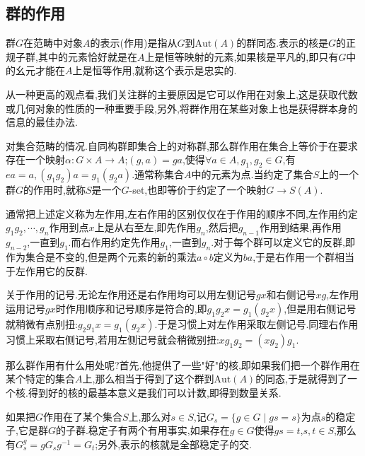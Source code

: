 \subsection{群的作用}

群$G$在范畴中对象$A$的表示(作用)是指从$G$到$\mathrm{Aut}(A)$的群同态.表示的核是$G$的正规子群,其中的元素恰好就是在$A$上是恒等映射的元素,如果核是平凡的,即只有$G$中的幺元才能在$A$上是恒等作用,就称这个表示是忠实的.

从一种更高的观点看,我们关注群的主要原因是它可以作用在对象上,这是获取代数或几何对象的性质的一种重要手段,另外,将群作用在某些对象上也是获得群本身的信息的最佳办法.

对集合范畴的情况.自同构群即集合上的对称群,那么群作用在集合上等价于在要求存在一个映射$\alpha:G\times A\to A$;$(g,a)=ga$,使得$\forall a\in A,g_1,g_2\in G$,有$ea=a,(g_1g_2)a=g_1(g_2a)$.通常称集合$A$中的元素为点.当约定了集合$S$上的一个群$G$的作用时,就称$S$是一个$G$-set,也即等价于约定了一个映射$G\to S(A)$.

通常把上述定义称为左作用,左右作用的区别仅仅在于作用的顺序不同,左作用约定$g_1g_2,\cdots,g_n$作用到点$x$上是从右至左,即先作用$g_n$,然后把$g_{n-1}$作用到结果,再作用$g_{n-2}$,一直到$g_1$.而右作用约定先作用$g_1$,一直到$g_n$.对于每个群可以定义它的反群,即作为集合是不变的,但是两个元素的新的乘法$a\circ b$定义为$ba$,于是右作用一个群相当于左作用它的反群.

关于作用的记号.无论左作用还是右作用均可以用左侧记号$gx$和右侧记号$xg$,左作用运用记号$gx$时作用顺序和记号顺序是符合的,即$g_1g_2x=g_1(g_2x)$,但是用右侧记号就稍微有点别扭:$g_2g_1x=g_1(g_2x)$.于是习惯上对左作用采取左侧记号.同理右作用习惯上采取右侧记号,若用左侧记号就会稍微别扭:$xg_1g_2=(xg_2)g_1$.

那么群作用有什么用处呢?首先,他提供了一些"好"的核,即如果我们把一个群作用在某个特定的集合$A$上,那么相当于得到了这个群到$\mathrm{Aut}(A)$的同态,于是就得到了一个核.得到好的核的最基本意义是我们可以计数,即得到数量关系.

如果把$G$作用在了某个集合$S$上,那么对$s\in S$,记$G_s=\{g\in G\mid gs=s\}$为点$s$的稳定子,它是群$G$的子群.稳定子有两个有用事实,如果存在$g\in G$使得$gs=t$,$s,t\in S$,那么有$G_s^g=gG_sg^{-1}=G_t$;另外,表示的核就是全部稳定子的交.

